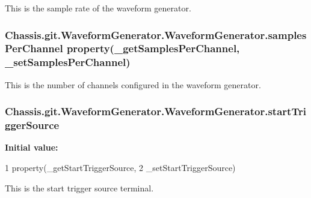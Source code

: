 This is the sample rate of the waveform generator. 

\hypertarget{class_chassis_8git_1_1_waveform_generator_1_1_waveform_generator_aa02528250ab9e7fd9ab04c3244eb8299}{
\subsubsection[{samples\-Per\-Channel}]{\setlength{\rightskip}{0pt plus 5cm}Chassis.\-git.\-Waveform\-Generator.\-Waveform\-Generator.\-samples\-Per\-Channel property(\-\_\-get\-Samples\-Per\-Channel, \-\_\-set\-Samples\-Per\-Channel)\hspace{0.3cm}{\ttfamily [static]}}}\label{class_chassis_8git_1_1_waveform_generator_1_1_waveform_generator_aa02528250ab9e7fd9ab04c3244eb8299}


This is the number of channels configured in the waveform generator. 

\hypertarget{class_chassis_8git_1_1_waveform_generator_1_1_waveform_generator_af18771d98f5d12ff87a18c94cc6e6035}{
\subsubsection[{start\-Trigger\-Source}]{\setlength{\rightskip}{0pt plus 5cm}Chassis.\-git.\-Waveform\-Generator.\-Waveform\-Generator.\-start\-Trigger\-Source\hspace{0.3cm}{\ttfamily [static]}}}\label{class_chassis_8git_1_1_waveform_generator_1_1_waveform_generator_af18771d98f5d12ff87a18c94cc6e6035}
{\bfseries Initial value\-:}
\begin{DoxyCode}
1 property(\_getStartTriggerSource,
2             \_setStartTriggerSource)
\end{DoxyCode}


This is the start trigger source terminal. 

